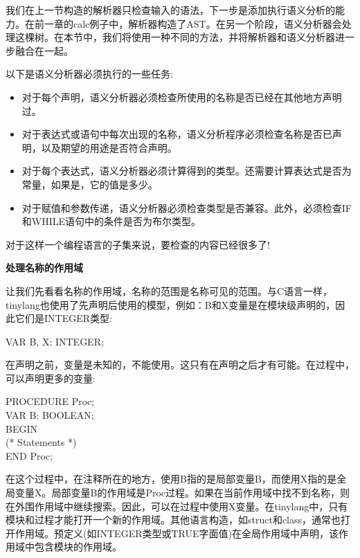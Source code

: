 我们在上一节构造的解析器只检查输入的语法，下一步是添加执行语义分析的能力。在前一章的calc例子中，解析器构造了AST。在另一个阶段，语义分析器会处理这棵树。在本节中，我们将使用一种不同的方法，并将解析器和语义分析器进一步融合在一起。\par

以下是语义分析器必须执行的一些任务:\par

\begin{itemize}
	\item 对于每个声明，语义分析器必须检查所使用的名称是否已经在其他地方声明过。
	\item 对于表达式或语句中每次出现的名称，语义分析程序必须检查名称是否已声明，以及期望的用途是否符合声明。
	\item 对于每个表达式，语义分析器必须计算得到的类型。还需要计算表达式是否为常量，如果是，它的值是多少。
	\item 对于赋值和参数传递，语义分析器必须检查类型是否兼容。此外，必须检查IF和WHILE语句中的条件是否为布尔类型。
\end{itemize}

对于这样一个编程语言的子集来说，要检查的内容已经很多了!\par

\hspace*{\fill} \par %
\textbf{处理名称的作用域}

让我们先看看名称的作用域，名称的范围是名称可见的范围。与C语言一样，tinylang也使用了先声明后使用的模型，例如：B和X变量是在模块级声明的，因此它们是INTEGER类型:\par

\begin{tcolorbox}[colback=white,colframe=black]
VAR B, X: INTEGER;
\end{tcolorbox}

在声明之前，变量是未知的，不能使用。这只有在声明之后才有可能。在过程中，可以声明更多的变量:\par

\begin{tcolorbox}[colback=white,colframe=black]
PROCEDURE Proc; \\
VAR B: BOOLEAN; \\
BEGIN \\
\hspace*{0.5cm}(* Statements *)\\
END Proc;
\end{tcolorbox}

在这个过程中，在注释所在的地方，使用B指的是局部变量B，而使用X指的是全局变量X。局部变量B的作用域是Proc过程。如果在当前作用域中找不到名称，则在外围作用域中继续搜索。因此，可以在过程中使用X变量。在tinylang中，只有模块和过程才能打开一个新的作用域。其他语言构造，如struct和class，通常也打开作用域。预定义(如INTEGER类型或TRUE字面值)在全局作用域中声明，该作用域中包含模块的作用域。\par

